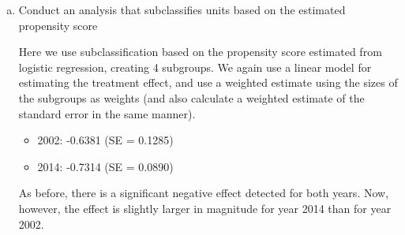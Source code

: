 \begin{enumerate}[(a)]


\item
  \begin{quoting}
    Conduct an analysis that subclassifies units based on the
    estimated propensity score
  \end{quoting}
  Here we use subclassification based on the propensity score
  estimated from logistic regression, creating 4 subgroups.  We again
  use a linear model for estimating the treatment effect, and use a
  weighted estimate using the sizes of the subgroups as weights (and
  also calculate a weighted estimate of the standard error in the same
  manner).
  \begin{itemize}
  \item 2002: -0.6381 (SE = 0.1285)
  \item 2014: -0.7314 (SE = 0.0890)
  \end{itemize}
  As before, there is a significant negative effect detected for both
  years.  Now, however, the effect is slightly larger in magnitude for
  year 2014 than for year 2002.


\end{enumerate}
